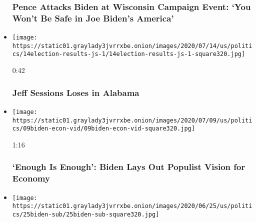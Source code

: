 \begin{itemize}
  \hypertarget{pence-attacks-biden-at-wisconsin-campaign-event-you-wont-be-safe-in-joe-bidens-america}{%
  \subsubsection{Pence Attacks Biden at Wisconsin Campaign Event: `You
  Won't Be Safe in Joe Biden's
  America'}\label{pence-attacks-biden-at-wisconsin-campaign-event-you-wont-be-safe-in-joe-bidens-america}}
\item
  \href{https://www.nytimes3xbfgragh.onion/video/us/politics/100000007239700/jeff-sessions-alabama.html?action=click\&module=video-series-bar\&region=header\&pgtype=Article\&playlistId=video/2020-Elections}{}

  \texttt{[image: https://static01.graylady3jvrrxbe.onion/images/2020/07/14/us/politics/14election-results-js-1/14election-results-js-1-square320.jpg]}

  0:42

  \hypertarget{jeff-sessions-loses-in-alabama}{%
  \subsubsection{Jeff Sessions Loses in
  Alabama}\label{jeff-sessions-loses-in-alabama}}
\item
  \href{https://www.nytimes3xbfgragh.onion/video/us/politics/100000007231038/live-biden-speech-scranton.html?action=click\&module=video-series-bar\&region=header\&pgtype=Article\&playlistId=video/2020-Elections}{}

  \texttt{[image: https://static01.graylady3jvrrxbe.onion/images/2020/07/09/us/politics/09biden-econ-vid/09biden-econ-vid-square320.jpg]}

  1:16

  \hypertarget{enough-is-enough-biden-lays-out-populist-vision-for-economy}{%
  \subsubsection{`Enough Is Enough': Biden Lays Out Populist Vision for
  Economy}\label{enough-is-enough-biden-lays-out-populist-vision-for-economy}}
\item
  \href{https://www.nytimes3xbfgragh.onion/video/us/100000007210595/biden-trump-coronavirus.html?action=click\&module=video-series-bar\&region=header\&pgtype=Article\&playlistId=video/2020-Elections}{}

  \texttt{[image: https://static01.graylady3jvrrxbe.onion/images/2020/06/25/us/politics/25biden-sub/25biden-sub-square320.jpg]}


\end{itemize}
